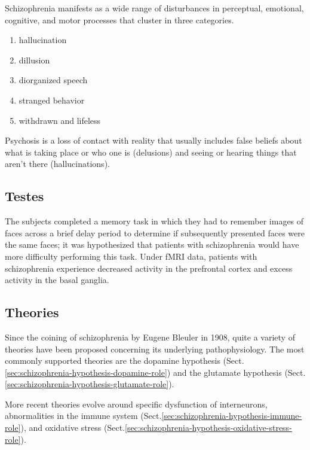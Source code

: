 Schizophrenia manifests as a wide range of disturbances in perceptual,
emotional, cognitive, and motor processes that cluster in three categories.
\begin{enumerate}
  \item hallucination
  
  \item dillusion
  
  \item diorganized speech
  
  \item stranged behavior
  
  \item withdrawn and lifeless
\end{enumerate}

Psychosis is a loss of contact with reality that usually includes false beliefs
about what is taking place or who one is (delusions) and seeing or hearing
things that aren't there (hallucinations).


\subsection{Testes}

The subjects completed a memory task in which they had to remember images of
faces across a brief delay period to determine if subsequently presented faces
were the same faces; it was hypothesized that patients with schizophrenia would
have more difficulty performing this task.
Under fMRI data, patients with schizophrenia experience decreased activity in
the prefrontal cortex and excess activity in the basal ganglia.


\subsection{Theories}
\label{sec:schizopherenia-theories}

Since the coining of schizophrenia by Eugene Bleuler in 1908, quite a variety of
theories have been proposed concerning its underlying pathophysiology.
The most commonly supported theories are the dopamine hypothesis
(Sect.\ref{sec:schizophrenia-hypothesis-dopamine-role}) and the
glutamate hypothesis (Sect.\ref{sec:schizophrenia-hypothesis-glutamate-role}).

More recent theories evolve around specific dysfunction of interneurons,
abnormalities in the immune system
(Sect.\ref{sec:schizophrenia-hypothesis-immune-role}), and oxidative stress
(Sect.\ref{sec:schizophrenia-hypothesis-oxidative-stress-role}).


